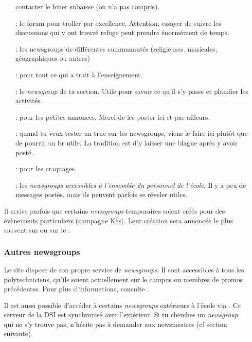 \begin{itemize}
       contacter le binet subaïsse (on n'a pas compris).
 \item[\ngname{br.binet.polemix} :] le forum pour troller par excellence.
                           Attention, essayer de suivre les discussions qui y ont trouvé refuge
                           peut prendre énormément de temps.
 \item[\ngname{br.communauté.*} :] les newsgroups de différentes communautés
                            (religieuses, musicales, géographiques ou autres)
 \item[\ngname{br.enseignement} :] pour tout ce qui a trait à l'enseignement.
 \item[\ngname{br.section.ta\_section\_sportive} :] le \emph{newsgroup} de ta section.
                                           Utile pour savoir ce qu'il s'y passe et planifier les activités.
 \item[\ngname{br.pa} :] pour les petites annonces. Merci de les poster ici et pas ailleurs.
 \item[\ngname{br.test} :] quand tu veux tester un truc sur les newsgroups,
                  viens le faire ici plutôt que de pourrir un br utile. La tradition est  d'y laisser une blague après y avoir posté.
 \item[\ngname{br.trash} :] pour les craquages.
 \item[\ngname{public.*} :] les \emph{newsgroups accessibles à l'ensemble du personnel de l'école}.
                   Il y a peu de messages postés, mais ils peuvent parfois se réveler utiles.
\end{itemize}

Il arrive parfois que certains \emph{newsgroups} temporaires soient créés pour des évènements particuliers (campagne Kès). Leur création sera annoncée
le plus souvent sur \fkz ou sur le .

\subsubsection{Autres newsgroups}
Le site  dispose de son propre service de \emph{newsgroups}. Il sont
accessibles à tous les polytechniciens, qu'ils soient actuellement sur le campus ou membres de
promos précédentes. Pour plus d'informations, consulte .

Il est aussi possible d'accéder à certains \emph{newsgroups} extérieurs à l'école via . Ce serveur de la DSI est synchronisé avec
l'extérieur. Si tu cherches un \emph{newsgroup} qui ne s'y trouve pas, n'hésite pas à demander aux newsmestres (cf section suivante).

